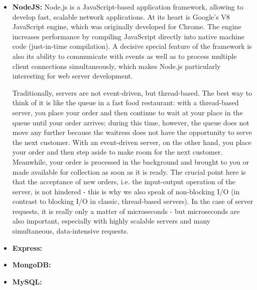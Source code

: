 \begin{itemize}
    \item \textbf{NodeJS:} 
    Node.js is a JavaScript-based application framework, allowing to develop fast, scalable network applications. At its heart is Google's V8 JavaScript engine, which was originally developed for Chrome. The engine increases performance by compiling JavaScript directly into native machine code (just-in-time compilation).
    A decisive special feature of the framework is also its ability to communicate with events as well as to process multiple client connections simultaneously, which makes Node.js particularly interesting for web server development.
    
    Traditionally, servers are not event-driven, but thread-based. The best way to think of it is like the queue in a fast food restaurant: with a thread-based server, you place your order and then continue to wait at your place in the queue until your order arrives; during this time, however, the queue does not move any further because the waitress does not have the opportunity to serve the next customer.
    With an event-driven server, on the other hand, you place your order and then step aside to make room for the next customer. Meanwhile, your order is processed in the background and brought to you or made available for collection as soon as it is ready.
    The crucial point here is that the acceptance of new orders, i.e. the input-output operation of the server, is not hindered - this is why we also speak of non-blocking I/O (in contrast to blocking I/O in classic, thread-based servers).
    In the case of server requests, it is really only a matter of microseconds - but microseconds are also important, especially with highly scalable servers and many simultaneous, data-intensive requests.
    \item \textbf{Express:} %
    \item \textbf{MongoDB:} %
    \item \textbf{MySQL:} %
\end{itemize}
